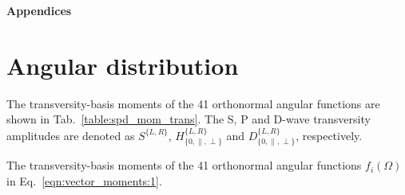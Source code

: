 {\noindent\normalfont\bfseries\Large Appendices}

\appendix

\section{Angular distribution}
\label{sec:appendix:angular-distribution}

The transversity-basis moments of the 41 orthonormal angular functions are shown in Tab.~\ref{table:spd_mom_trans}.  The S, P and D-wave transversity amplitudes are denoted as $S^{\{L,R\}}$, $H^{\{L,R\}}_{\{0,\parallel,\perp\}}$ and $D^{\{L,R\}}_{\{0,\parallel,\perp\}}$, respectively.

\begin{table}[!htb]
\centering
\resizebox{\textwidth}{!}{

}
\caption{The transversity-basis moments of the 41 orthonormal angular functions $f_i(\Omega)$ in Eq.~\ref{eqn:vector_moments:1}.}
\label{table:spd_mom_trans}
\end{table}